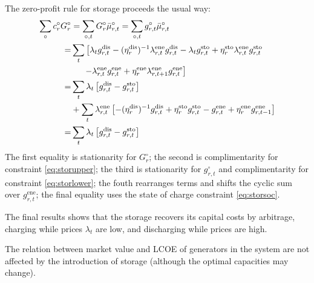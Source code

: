 \documentclass[final,3p]{elsarticle}
\def\l{\lambda} \def\K{\kappa} \def\m{\mu} \def\G{\Gamma} \def\d{\partial}
\begin{document}
The zero-profit rule for storage proceeds the usual way:
\begin{align}
  \sum_\circ c^\circ_r G^\circ_r & =  \sum_{\circ,t} G^\circ_r\bar{\m}^\circ_{r,t}  =   \sum_{\circ,t} g^\circ_{r,t}\bar{\m}^\circ_{r,t} \nonumber                                                                                                                         \\
  =                              & \sum_t \left[ \l_t g^{\textrm{dis}}_{r,t} -(\eta^{\textrm{dis}}_r)^{-1} \l^{\textrm{ene}}_{r,t}  g^{\textrm{dis}}_{r,t}
  -\l_t g^{\textrm{sto}}_{r,t} + \eta^{\textrm{sto}}_r \l^{\textrm{ene}}_{r,t} g^{\textrm{sto}}_{r,t} \right.\nonumber                                                                                                                                                     \\
                                 & \left. \hspace{.5cm}-\l^{\textrm{ene}}_{r,t}g^{\textrm{ene}}_{r,t} + \eta^{\textrm{ene}}_r \l^{\textrm{ene}}_{r,t+1}g^{\textrm{ene}}_{r,t} \right] \nonumber                                                                            \\
  =                              & \sum_t \l_t \left[ g^{\textrm{dis}}_{r,t} - g^{\textrm{sto}}_{r,t}  \right] \nonumber                                                                                                                                                   \\
                                 & + \sum_t  \l^{\textrm{ene}}_{r,t} \left[ -(\eta^{\textrm{dis}}_r)^{-1} g^{\textrm{dis}}_{r,t}+ \eta^{\textrm{sto}}_r  g^{\textrm{sto}}_{r,t} -g^{\textrm{ene}}_{r,t} + \eta^{\textrm{ene}}_r g^{\textrm{ene}}_{r,t-1} \right] \nonumber \\
  =                              & \sum_t \l_t \left[ g^{\textrm{dis}}_{r,t} - g^{\textrm{sto}}_{r,t}  \right]
\end{align}
The first equality is stationarity for $G^\circ_r$; the second is
complimentarity for constraint \eqref{eq:storupper}; the third is stationarity
for $g^\circ_{r,t}$ and complimentarity for constraint \eqref{eq:storlower}; the
fouth rearranges terms and shifts the cyclic sum over $g^{\textrm{ene}}_{r,t}$;
the final equality uses the state of charge constraint \eqref{eq:storsoc}.

The final results shows that the storage recovers its capital costs by
arbitrage, charging while prices $\l_t$ are low, and discharging while prices
are high.

The relation between market value and LCOE of generators in the system are not
affected by the introduction of storage (although the optimal capacities may
change).



\end{document}
